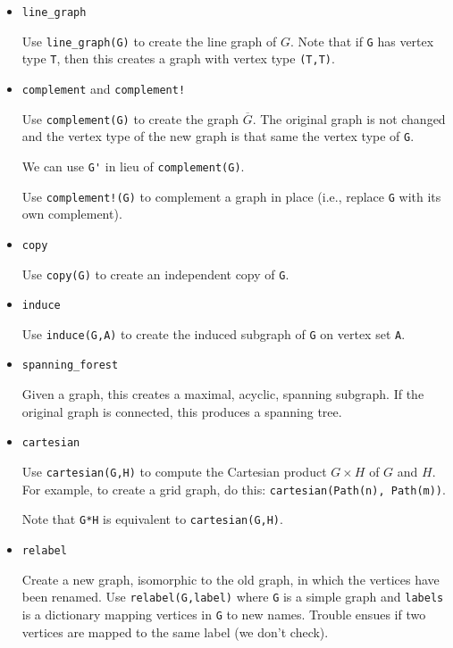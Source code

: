 \documentclass[oneside]{amsart}
\begin{document}
\begin{itemize}

\item \verb|line_graph|

  Use \verb|line_graph(G)| to create the line graph of $G$. Note that
  if \verb|G| has vertex type \verb|T|, then this creates a graph with
  vertex type \verb|(T,T)|.

\item \verb|complement| and \verb|complement!|

  Use \verb|complement(G)| to create the graph $\overline{G}$. The
  original graph is not changed and the vertex type of the new graph
  is that same the vertex type of \verb|G|.

  We can use \verb|G'| in lieu of \verb|complement(G)|.

  Use \verb|complement!(G)| to complement a graph in place (i.e.,
  replace \verb|G| with its own complement).


\item \verb|copy|

  Use \verb|copy(G)| to create an independent copy of \verb|G|.

\item \verb|induce|

  Use \verb|induce(G,A)| to create the induced subgraph of \verb|G| on
  vertex set \verb|A|.

\item \verb|spanning_forest|

  Given a graph, this creates a maximal, acyclic, spanning
  subgraph. If the original graph is connected, this produces a
  spanning tree.


\item \verb|cartesian|

  Use \verb|cartesian(G,H)| to compute the Cartesian product $G\times
  H$ of $G$ and $H$. For example, to create a grid graph, do this:
  \verb|cartesian(Path(n), Path(m))|.

  Note that \verb|G*H| is equivalent to \verb|cartesian(G,H)|.

\item \verb|relabel|

  Create a new graph, isomorphic to the old graph, in which the
  vertices have been renamed. Use \verb|relabel(G,label)| where
  \verb|G| is a simple graph and \verb|labels| is a dictionary mapping
  vertices in \verb|G| to new names. Trouble ensues if two vertices
  are mapped to the same label (we don't check).


\end{itemize}
\end{document}
